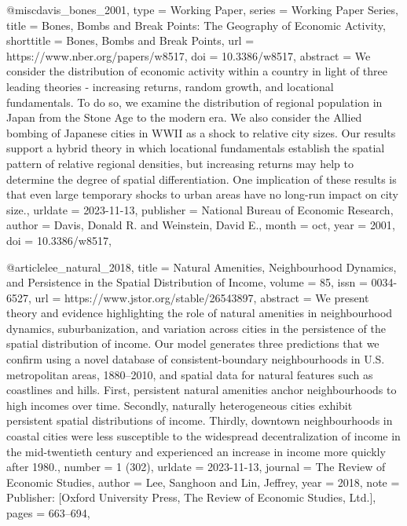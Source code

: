 {@misc{davis_bones_2001,
	type = {Working {Paper}},
	series = {Working {Paper} {Series}},
	title = {Bones, {Bombs} and {Break} {Points}: {The} {Geography} of {Economic} {Activity}},
	shorttitle = {Bones, {Bombs} and {Break} {Points}},
	url = {https://www.nber.org/papers/w8517},
	doi = {10.3386/w8517},
	abstract = {We consider the distribution of economic activity within a country in light of three leading theories - increasing returns, random growth, and locational fundamentals. To do so, we examine the distribution of regional population in Japan from the Stone Age to the modern era. We also consider the Allied bombing of Japanese cities in WWII as a shock to relative city sizes. Our results support a hybrid theory in which locational fundamentals establish the spatial pattern of relative regional densities, but increasing returns may help to determine the degree of spatial differentiation. One implication of these results is that even large temporary shocks to urban areas have no long-run impact on city size.},
	urldate = {2023-11-13},
	publisher = {National Bureau of Economic Research},
	author = {Davis, Donald R. and Weinstein, David E.},
	month = oct,
	year = {2001},
	doi = {10.3386/w8517},
}

@article{lee_natural_2018,
	title = {Natural {Amenities}, {Neighbourhood} {Dynamics}, and {Persistence} in the {Spatial} {Distribution} of {Income}},
	volume = {85},
	issn = {0034-6527},
	url = {https://www.jstor.org/stable/26543897},
	abstract = {We present theory and evidence highlighting the role of natural amenities in neighbourhood dynamics, suburbanization, and variation across cities in the persistence of the spatial distribution of income. Our model generates three predictions that we confirm using a novel database of consistent-boundary neighbourhoods in U.S. metropolitan areas, 1880–2010, and spatial data for natural features such as coastlines and hills. First, persistent natural amenities anchor neighbourhoods to high incomes over time. Secondly, naturally heterogeneous cities exhibit persistent spatial distributions of income. Thirdly, downtown neighbourhoods in coastal cities were less susceptible to the widespread decentralization of income in the mid-twentieth century and experienced an increase in income more quickly after 1980.},
	number = {1 (302)},
	urldate = {2023-11-13},
	journal = {The Review of Economic Studies},
	author = {Lee, Sanghoon and Lin, Jeffrey},
	year = {2018},
	note = {Publisher: [Oxford University Press, The Review of Economic Studies, Ltd.]},
	pages = {663--694},
}

}
